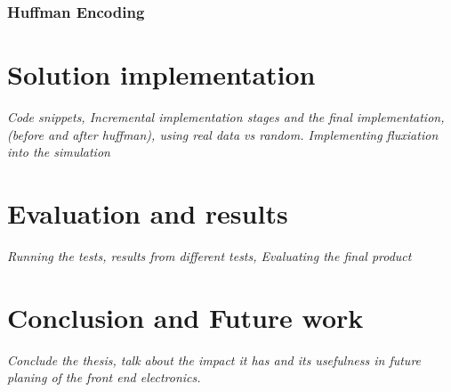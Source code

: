 \documentclass[a4paper]{report}
\begin{document}
\subsection{Huffman Encoding}

\chapter{Solution implementation}
\textit{Code snippets, Incremental implementation stages and the final implementation, (before and after huffman), using real data vs random. Implementing fluxiation into the simulation}

\chapter{Evaluation and results}
\textit{Running the tests, results from different tests, Evaluating the final product}

\chapter{Conclusion and Future work}
\textit{Conclude the thesis, talk about the impact it has and its usefulness in future planing of the front end electronics.}

{}

\end{document}
